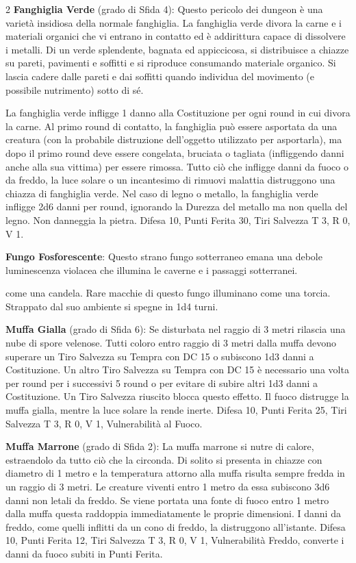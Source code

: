 \begin{multicols}{2}
\textbf{Fanghiglia Verde} (grado di Sfida 4): Questo pericolo dei dungeon è una varietà insidiosa della normale fanghiglia.
La fanghiglia verde divora la carne e i materiali organici che vi entrano in contatto ed è addirittura capace di dissolvere i metalli. Di un verde splendente, bagnata ed appiccicosa, si distribuisce a chiazze su pareti, pavimenti e soffitti e si riproduce consumando materiale organico. Si lascia cadere dalle pareti e dai soffitti quando individua del movimento (e possibile nutrimento) sotto di sé.

La fanghiglia verde infligge 1 danno alla Costituzione per ogni round in cui divora la carne. Al primo round di contatto, la fanghiglia può essere asportata da una creatura (con la probabile distruzione dell'oggetto utilizzato per asportarla), ma dopo il primo round deve essere congelata, bruciata o tagliata (infliggendo danni anche alla sua vittima) per essere rimossa. Tutto ciò che infligge danni da fuoco o da freddo, la luce solare o un incantesimo di rimuovi malattia distruggono una chiazza di fanghiglia verde. Nel caso di legno o metallo, la fanghiglia verde infligge 2d6 danni per round, ignorando la Durezza del metallo ma non quella del legno. Non danneggia la pietra. Difesa 10, Punti Ferita 30, Tiri Salvezza T 3, R 0, V 1.

\textbf{Fungo Fosforescente}: Questo strano fungo sotterraneo emana una debole luminescenza violacea che illumina le caverne e i passaggi sotterranei.

come una candela. Rare macchie di questo fungo illuminano come una torcia. Strappato dal suo ambiente si spegne in 1d4 turni.

\textbf{Muffa Gialla} (grado di Sfida 6): Se disturbata nel raggio di 3 metri rilascia una nube di spore velenose. Tutti coloro entro raggio di 3 metri dalla muffa devono superare un Tiro Salvezza su Tempra con DC 15 o subiscono 1d3 danni a Costituzione. Un altro Tiro Salvezza su Tempra con DC 15 è necessario una volta per round per i successivi 5 round o per evitare di subire altri 1d3 danni a Costituzione. Un Tiro Salvezza riuscito blocca questo effetto. Il fuoco distrugge la muffa gialla, mentre la luce solare la rende inerte. Difesa 10, Punti Ferita 25, Tiri Salvezza T 3, R 0, V 1, Vulnerabilità al Fuoco.

\textbf{Muffa Marrone} (grado di Sfida 2): La muffa marrone si nutre di calore, estraendolo da tutto ciò che la circonda. Di solito si presenta in chiazze con diametro di 1 metro e la temperatura attorno alla muffa risulta sempre fredda in un raggio di 3 metri. Le creature viventi entro 1 metro da essa subiscono 3d6 danni non letali da freddo. Se viene portata una fonte di fuoco entro 1 metro dalla muffa questa raddoppia immediatamente le proprie dimensioni. I danni da freddo, come quelli inflitti da un cono di freddo, la distruggono all'istante. Difesa 10, Punti Ferita 12, Tiri Salvezza T 3, R 0, V 1, Vulnerabilità Freddo, converte i danni da fuoco subiti in Punti Ferita.


\end{multicols}
